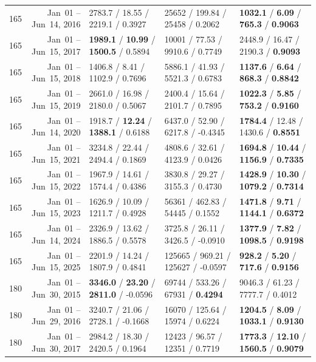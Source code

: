 \begin{longtable}{r r l l l}
165 & Jan~01 -- Jun~14, 2016 & 2783.7 / 18.55 / 2219.1 / 0.3927 & 25652 / 199.84 / 25458 / 0.2062 & \textbf{1032.1} / \textbf{6.09} / \textbf{765.3} / \textbf{0.9063} \\
165 & Jan~01 -- Jun~15, 2017 & \textbf{1989.1} / \textbf{10.99} / \textbf{1500.5} / 0.5894 & 10001 / 77.53 / 9910.6 / 0.7749 & 2448.9 / 16.47 / 2190.3 / \textbf{0.9093} \\
165 & Jan~01 -- Jun~15, 2018 & 1406.8 / 8.41 / 1102.9 / 0.7696 & 5886.1 / 41.93 / 5521.3 / 0.6783 & \textbf{1137.6} / \textbf{6.64} / \textbf{868.3} / \textbf{0.8842} \\
165 & Jan~01 -- Jun~15, 2019 & 2661.0 / 16.98 / 2180.0 / 0.5067 & 2400.4 / 15.64 / 2101.7 / 0.7895 & \textbf{1022.3} / \textbf{5.85} / \textbf{753.2} / \textbf{0.9160} \\
165 & Jan~01 -- Jun~14, 2020 & 1918.7 / \textbf{12.24} / \textbf{1388.1} / 0.6188 & 6437.0 / 52.90 / 6217.8 / -0.4345 & \textbf{1784.4} / 12.48 / 1430.6 / \textbf{0.8551} \\
165 & Jan~01 -- Jun~15, 2021 & 3234.8 / 22.44 / 2494.4 / 0.1869 & 4808.6 / 32.61 / 4123.9 / 0.0426 & \textbf{1694.8} / \textbf{10.44} / \textbf{1156.9} / \textbf{0.7335} \\
165 & Jan~01 -- Jun~15, 2022 & 1967.9 / 14.61 / 1574.4 / 0.4386 & 3830.8 / 29.27 / 3155.3 / 0.4730 & \textbf{1428.9} / \textbf{10.30} / \textbf{1079.2} / \textbf{0.7314} \\
165 & Jan~01 -- Jun~15, 2023 & 1626.9 / 10.09 / 1211.7 / 0.4928 & 56361 / 462.83 / 54445 / 0.1552 & \textbf{1471.8} / \textbf{9.71} / \textbf{1144.1} / \textbf{0.6372} \\
165 & Jan~01 -- Jun~14, 2024 & 2326.9 / 13.62 / 1886.5 / 0.5578 & 3725.8 / 26.11 / 3426.5 / -0.0910 & \textbf{1377.9} / \textbf{7.82} / \textbf{1098.5} / \textbf{0.9198} \\
165 & Jan~01 -- Jun~15, 2025 & 2201.9 / 14.24 / 1807.9 / 0.4841 & 125665 / 969.21 / 125627 / -0.0597 & \textbf{928.2} / \textbf{5.20} / \textbf{717.6} / \textbf{0.9156} \\
\midrule
180 & Jan~01 -- Jun~30, 2015 & \textbf{3346.0} / \textbf{23.20} / \textbf{2811.0} / -0.0596 & 69744 / 533.26 / 67931 / \textbf{0.4294} & 9046.3 / 61.23 / 7777.7 / 0.4012 \\
180 & Jan~01 -- Jun~29, 2016 & 3240.7 / 21.06 / 2728.1 / -0.1668 & 16070 / 125.64 / 15974 / 0.6224 & \textbf{1204.5} / \textbf{8.09} / \textbf{1033.1} / \textbf{0.9130} \\
180 & Jan~01 -- Jun~30, 2017 & 2984.2 / 18.30 / 2420.5 / 0.1964 & 12423 / 96.57 / 12351 / 0.7719 & \textbf{1773.3} / \textbf{12.10} / \textbf{1560.5} / \textbf{0.9079} \\

\end{longtable}
